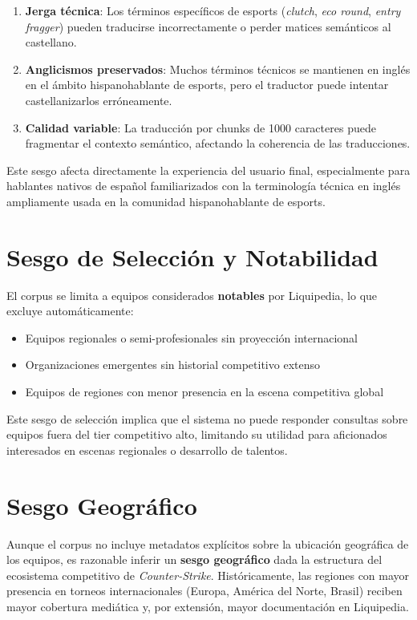 \begin{enumerate}
    \item \textbf{Jerga técnica}: Los términos específicos de esports (\textit{clutch}, \textit{eco round}, \textit{entry fragger}) pueden traducirse incorrectamente o perder matices semánticos al castellano.
    \item \textbf{Anglicismos preservados}: Muchos términos técnicos se mantienen en inglés en el ámbito hispanohablante de esports, pero el traductor puede intentar castellanizarlos erróneamente.
    \item \textbf{Calidad variable}: La traducción por chunks de 1000 caracteres puede fragmentar el contexto semántico, afectando la coherencia de las traducciones.
\end{enumerate}

Este sesgo afecta directamente la experiencia del usuario final, especialmente para hablantes nativos de español familiarizados con la terminología técnica en inglés ampliamente usada en la comunidad hispanohablante de esports.

\section{Sesgo de Selección y Notabilidad}

El corpus se limita a equipos considerados \textbf{notables} por Liquipedia, lo que excluye automáticamente:

\begin{itemize}
    \item Equipos regionales o semi-profesionales sin proyección internacional
    \item Organizaciones emergentes sin historial competitivo extenso
    \item Equipos de regiones con menor presencia en la escena competitiva global
\end{itemize}

Este sesgo de selección implica que el sistema no puede responder consultas sobre equipos fuera del tier competitivo alto, limitando su utilidad para aficionados interesados en escenas regionales o desarrollo de talentos.

\section{Sesgo Geográfico}

Aunque el corpus no incluye metadatos explícitos sobre la ubicación geográfica de los equipos, es razonable inferir un \textbf{sesgo geográfico} dada la estructura del ecosistema competitivo de \textit{Counter-Strike}. Históricamente, las regiones con mayor presencia en torneos internacionales (Europa, América del Norte, Brasil) reciben mayor cobertura mediática y, por extensión, mayor documentación en Liquipedia.


